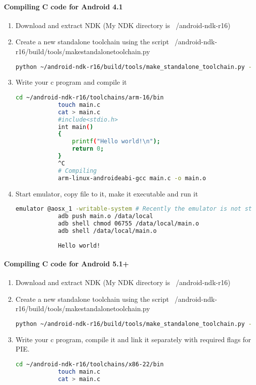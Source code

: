 \documentclass[../main.tex]{subfile}
\begin{document}
\begin{appendices}
		\paragraph{Compiling C code for Android 4.1}
		\begin{enumerate}
			\item Download and extract NDK (My NDK directory is ~/android-ndk-r16)
			\item Create a new standalone toolchain using the script ~/android-ndk-r16/build/tools/make\textunderscore standalone\textunderscore toolchain.py
			\begin{lstlisting}[language=bash, numbers=none]
				python ~/android-ndk-r16/build/tools/make_standalone_toolchain.py --arch arm --api 16 --install-dir ~/android-ndk-r16/toolchains/arm-16
			\end{lstlisting}
			\item Write your c program and compile it
			\begin{lstlisting}[language=bash]
			cd ~/android-ndk-r16/toolchains/arm-16/bin
			touch main.c
			cat > main.c
			#include<stdio.h>
			int main()
			{
				printf("Hello world!\n");
				return 0;
			}
			^C
			# Compiling
			arm-linux-androideabi-gcc main.c -o main.o
			\end{lstlisting}
			
			\item Start emulator, copy file to it, make it executable and run it
			
			\begin{lstlisting}[language=bash]
			emulator @aosx_1 -writable-system # Recently the emulator is not starting without writable, check if yours do
			adb push main.o /data/local
			adb shell chmod 06755 /data/local/main.o
			adb shell /data/local/main.o
			
			Hello world!
			\end{lstlisting}
		\end{enumerate}		


		\paragraph{Compiling C code for Android 5.1+}
		\begin{enumerate}
			\item Download and extract NDK (My NDK directory is ~/android-ndk-r16)
			\item Create a new standalone toolchain using the script ~/android-ndk-r16/build/tools/make\textunderscore standalone\textunderscore toolchain.py
			\begin{lstlisting}[language=bash, numbers=none]
			python ~/android-ndk-r16/build/tools/make_standalone_toolchain.py --arch x86 --api 22 --install-dir ~/android-ndk-r16/toolchains/x86-22
			\end{lstlisting}
			\item Write your c program, compile it and link it separately with required flags for PIE.
			\begin{lstlisting}[language=bash]
			cd ~/android-ndk-r16/toolchains/x86-22/bin
			touch main.c
			cat > main.c
			

\end{lstlisting}
\end{enumerate}
\end{appendices}
\end{document}
